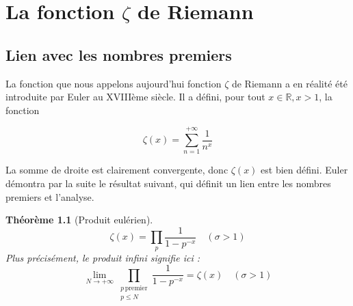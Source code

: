 \documentclass[french]{report}
\newtheorem{theorem}{Théorème}[section]
\begin{document}
\chapter{La fonction $\zeta$ de Riemann}

\section{Lien avec les nombres premiers}

La fonction que nous appelons aujourd'hui fonction $\zeta$ de Riemann a en réalité été introduite par Euler au XVIIIème siècle. Il a défini, pour tout $x\in\mathbb{R}, x>1$, la fonction

\[ \zeta(x) = \sum_{n=1}^{+\infty}\frac{1}{n^x} \]

La somme de droite est clairement convergente, donc $\zeta(x)$ est bien défini. Euler démontra par la suite le résultat suivant, qui définit un lien entre les nombres premiers et l'analyse.

\begin{theorem}[Produit eulérien]\label{thm:produit-eulerien-reel}
  \[ \zeta(x) = \prod_p\frac{1}{1-p^{-x}}\quad(\sigma>1) \]
  Plus précisément, le produit infini signifie ici :
  \[ \lim_{N\to+\infty}\prod_{\substack{p\,\mathrm{premier}\\p\leq N}}\frac{1}{1-p^{-x}}=\zeta(x)\quad(\sigma>1) \]
\end{theorem}
\end{document}
